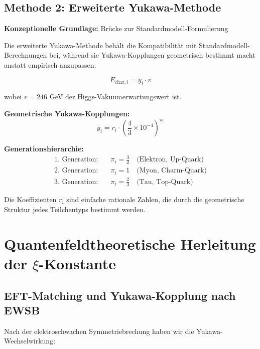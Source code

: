 \documentclass[12pt,a4paper]{article}
\begin{document}
	\subsection{Methode 2: Erweiterte Yukawa-Methode}
	\label{subsec:extended_yukawa_method}
	
	\textbf{Konzeptionelle Grundlage:} Brücke zur Standardmodell-Formulierung
	
	Die erweiterte Yukawa-Methode behält die Kompatibilität mit Standardmodell-Berechnungen bei, während sie Yukawa-Kopplungen geometrisch bestimmt macht anstatt empirisch anzupassen:
	
	\begin{equation}
		E_{\text{char},i} = y_i \cdot v
		\label{eq:yukawa_mass_formula}
	\end{equation}
	
	wobei $v = 246$ GeV der Higgs-Vakuumerwartungswert ist.
	
	\textbf{Geometrische Yukawa-Kopplungen:}
	\begin{equation}
		\boxed{y_i = r_i \cdot \left(\frac{4}{3} \times 10^{-4}\right)^{\pi_i}}
		\label{eq:geometric_yukawa}
	\end{equation}
	
	\textbf{Generationshierarchie:}
	\begin{align}
		\text{1. Generation:} \quad &\pi_i = \frac{3}{2} \quad \text{(Elektron, Up-Quark)} \\
		\text{2. Generation:} \quad &\pi_i = 1 \quad \text{(Myon, Charm-Quark)} \\
		\text{3. Generation:} \quad &\pi_i = \frac{2}{3} \quad \text{(Tau, Top-Quark)}
	\end{align}
	
	Die Koeffizienten $r_i$ sind einfache rationale Zahlen, die durch die geometrische Struktur jedes Teilchentyps bestimmt werden.
	
	\section{Quantenfeldtheoretische Herleitung der $\xi$-Konstante}
	\label{sec:qft_herleitung}
	
	\subsection{EFT-Matching und Yukawa-Kopplung nach EWSB}
	\label{subsec:eft_matching}
	
	Nach der elektroschwachen Symmetriebrechung haben wir die Yukawa-Wechselwirkung:
	
\end{document}
